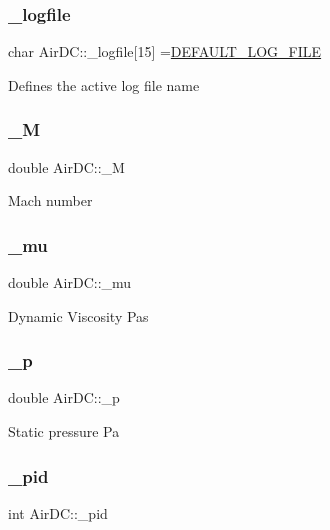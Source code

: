 \subsubsection{\texorpdfstring{\+\_\+logfile}{\_logfile}}
{\footnotesize\ttfamily char Air\+D\+C\+::\+\_\+logfile\mbox{[}15\mbox{]} =\hyperlink{_air_d_c_8h_a2ecbb6b97620287d0a619efd366a2b46}{D\+E\+F\+A\+U\+L\+T\+\_\+\+L\+O\+G\+\_\+\+F\+I\+LE}}

Defines the active log file name \mbox{\label{class_air_d_c_a64c61411ff1046d4208729fd60843fcf}} 
\subsubsection{\texorpdfstring{\+\_\+M}{\_M}}
{\footnotesize\ttfamily double Air\+D\+C\+::\+\_\+M}

Mach number \mbox{\label{class_air_d_c_a20551125b780e1ece94dd41a896c23e3}} 
\subsubsection{\texorpdfstring{\+\_\+mu}{\_mu}}
{\footnotesize\ttfamily double Air\+D\+C\+::\+\_\+mu}

Dynamic Viscosity Pas \mbox{\label{class_air_d_c_a0b72bf365fbe266f90f3f6474b6a412f}} 
\subsubsection{\texorpdfstring{\+\_\+p}{\_p}}
{\footnotesize\ttfamily double Air\+D\+C\+::\+\_\+p}

Static pressure Pa \mbox{\label{class_air_d_c_a9c4b0adc82bd69694271041d3ac456b6}} 
\subsubsection{\texorpdfstring{\+\_\+pid}{\_pid}}
{\footnotesize\ttfamily int Air\+D\+C\+::\+\_\+pid}

